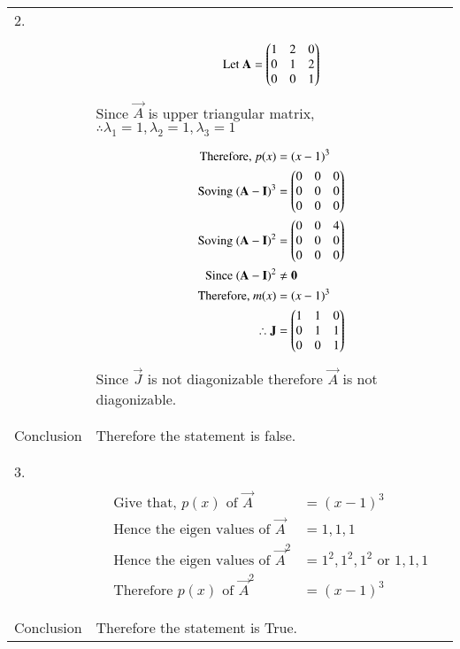 \documentclass[journal,12pt]{IEEEtran}
\begin{document}
\begin{longtable}{|l|l|}
2.&\\
&\parbox{6cm}{\begin{align*}
    \mbox{Let }\mathbf{A}&=\begin{pmatrix}1&2&0\\0&1&2\\0&0&1\end{pmatrix}\\
\end{align*}}\\
&Since $\vec{A}$ is upper triangular matrix, $\therefore \lambda_{1}=1,\lambda_{2}=1,\lambda_{3}=1$ \\
&\parbox{6cm}{\begin{align*}
    \mbox{Therefore, }p(x)&=(x-1)^3\\
    \mbox{Soving }(\mathbf{A}-\mathbf{I})^3&=\begin{pmatrix}0&0&0\\0&0&0\\0&0&0\end{pmatrix}\\
    \mbox{Soving }(\mathbf{A}-\mathbf{I})^2&=\begin{pmatrix}0&0&4\\0&0&0\\0&0&0\end{pmatrix}\\
    \mbox{Since }(\mathbf{A}-\mathbf{I})^2&\neq \mathbf{0}\\
    \mbox{Therefore, }m(x)&=(x-1)^3\\
    \therefore \mathbf{J}&=\begin{pmatrix}1&1&0\\0&1&1\\0&0&1\end{pmatrix}
\end{align*}}\\
&Since $\vec{J}$ is not diagonizable therefore $\vec{A}$ is not diagonizable.\\
&\\
\hline
&\\
Conclusion&Therefore the statement is false.\\
&\\
\hline
&\\
3.&\\
&\parbox{6cm}{\begin{align*}
    \mbox{Give that, }p(x)\mbox{ of }\vec{A}&=(x-1)^3\\
    \mbox{Hence the eigen values of }\vec{A}&=1,1,1\\
    \mbox{Hence the eigen values of }\vec{A}^2&=1^2,1^2,1^2\mbox{ or } 1,1,1\\
    \mbox{Therefore }p(x)\mbox{ of }\vec{A}^2&=(x-1)^3
\end{align*}}\\
&\\
\hline
&\\
Conclusion&Therefore the statement is True.\\

\end{longtable}
\end{document}
